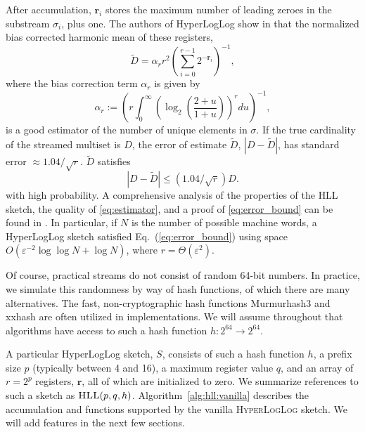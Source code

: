 \documentclass[10]{article}
\newcommand{\algoname}[1]{\textnormal{\textsc{#1}}}
\begin{document}
After accumulation, $\mathbf{r}_i$ stores the maximum number of leading zeroes in the substream $\sigma_i$, plus one. 
The authors of HyperLogLog show in \cite{flajolet2007hyperloglog} that the normalized bias corrected harmonic mean of these registers,
%
\begin{equation} \label{eq:estimator}
\widetilde{D} = \alpha_r r^2 \left ( \sum_{i=0}^{r-1} 2^{-\mathbf{r}_i} \right) ^{-1},
\end{equation}
%
where the bias correction term $\alpha_r$ is given by
%
%
\begin{equation} \label{eq:alpha}
\alpha_r :=  \left( r \int_{0}^\infty \left( \log_2 \left( \frac{2 + u}{1 + u} \right) \right)^r du \right) ^{-1},
\end{equation}
is a good estimator of the number of unique elements in $\sigma$.
If the true cardinality of the streamed multiset is $D$, the error of estimate $\widetilde{D}$, $|D - \widetilde{D}|$, has standard error $\approx 1.04 / \sqrt{r}$. 
$\widetilde{D}$ satisfies
%
\begin{equation} \label{eq:error_bound}
|D - \widetilde{D}| \leq (1.04/\sqrt{r}) D.
\end{equation}
%
 with high probability.
A comprehensive analysis of the properties of the \algoname{HLL} sketch,  the quality of \eqref{eq:estimator}, and a proof of \eqref{eq:error_bound}  can be found in \cite{flajolet2007hyperloglog}.
In particular, if $N$ is the number of possible machine words, a HyperLogLog sketch satisfied Eq.~(\ref{eq:error_bound}) using space $O(\varepsilon^{-2} \log\log N + \log N)$, where $r = \Theta(\varepsilon^2)$.

Of course, practical streams do not consist of random 64-bit numbers. 
In practice, we simulate this randomness by way of hash functions, of which there are many alternatives. 
The fast, non-cryptographic hash functions Murmurhash3 \cite{murmurhash3} and xxhash \cite{xxhash} are often utilized in implementations. 
We will assume throughout that algorithms have access to such a hash function $h : 2^{64} \rightarrow 2^{64}$.

A particular HyperLogLog sketch, $S$, consists of such a hash function $h$, a prefix size $p$ (typically between 4 and 16), a maximum register value $q$, and an array of $r=2^p$ registers, $\mathbf{r}$, all of which are initialized to zero. 
We summarize references to such a sketch as $\algoname{HLL}(p,q,h)$.
Algorithm~\ref{alg:hll:vanilla} describes the accumulation and functions supported by the vanilla \algoname{HyperLogLog} sketch. 
We will add features in the next few sections. 
\end{document}
